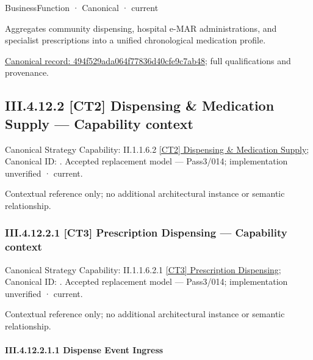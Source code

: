\label{element:494f529ada064f77836d40cfe9c7ab48}
{\small BusinessFunction · Canonical · current}\par

Aggregates community dispensing, hospital e-MAR administrations, and specialist prescriptions into a unified chronological medication profile.


{\footnotesize \href{../../../../../../../../continuum/business/business-function/494f529ada064f77836d40cfe9c7ab48.md}{Canonical record: 494f529ada064f77836d40cfe9c7ab48}; full qualifications and provenance.}\par
\subsection*{III.4.12.2 [CT2] Dispensing \& Medication Supply — Capability context}
\label{navigation:III.4.12.2}

{\small Canonical Strategy Capability: II.1.1.6.2 \hyperref[element:a85bdb32f6294d018e7d324cffd624d6]{[CT2] Dispensing \& Medication Supply}; Canonical ID: \texttt{}. Accepted replacement model — Pass3/014; implementation unverified · current.}\par
Contextual reference only; no additional architectural instance or semantic relationship.\par
\subsubsection*{III.4.12.2.1 [CT3] Prescription Dispensing — Capability context}
\label{navigation:III.4.12.2.1}

{\small Canonical Strategy Capability: II.1.1.6.2.1 \hyperref[element:2243de4f266e4ab6ba7964a1799f2c7e]{[CT3] Prescription Dispensing}; Canonical ID: \texttt{}. Accepted replacement model — Pass3/014; implementation unverified · current.}\par
Contextual reference only; no additional architectural instance or semantic relationship.\par
\paragraph*{III.4.12.2.1.1 Dispense Event Ingress}
\label{navigation:III.4.12.2.1.1}

